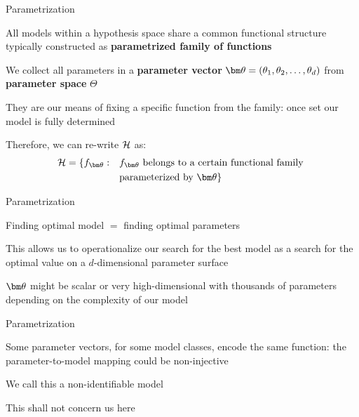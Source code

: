 \documentclass[11pt,compress,t,notes=noshow, xcolor=table]{beamer}
\begin{document}
\begin{framei}{Parametrization}  
\item All models within a hypothesis space share a common functional structure typically constructed as \textbf{parametrized family of functions}
\item We collect all parameters in a \textbf{parameter vector} $\thetav = (\theta_1, \theta_2, \ldots, \theta_d)$ from \textbf{parameter space} $\Theta$
\item They are our means of fixing a specific function from the family: once set our model is fully determined
\item Therefore, we can re-write $\mathcal{H}$ as:
\begin{equation*}
\begin{split}
\Hspace = \{f_{\thetav}: \quad & f_{\thetav} \text{ belongs to a certain functional family } \\
& \text{parameterized by } \thetav\}
\end{split}
\end{equation*}
\end{framei}


\begin{framei}{Parametrization}
\item Finding optimal model $=$ finding optimal parameters
\item This allows us to operationalize our search for the best model as a search for the optimal value on a $d$-dimensional parameter surface
\item $\thetav$ might be scalar or very high-dimensional with thousands of parameters depending on the complexity of our model
\end{framei}


\begin{framei}[sep=L]{Parametrization}
\item Some parameter vectors, for some model classes, encode the same function: the parameter-to-model mapping could be non-injective
\item We call this a non-identifiable model
\item This shall not concern us here
\end{framei}
\end{document}
